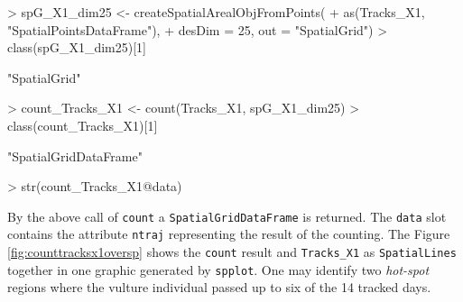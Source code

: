 \documentclass[12pt, oneside, a4paper]{scrbook}
\let\code=\texttt
\begin{document}
\begin{small}
\begin{Schunk}
\begin{Sinput}
> spG_X1_dim25 <- createSpatialArealObjFromPoints(
+   as(Tracks_X1, "SpatialPointsDataFrame"), 
+   desDim = 25, out = "SpatialGrid")
> class(spG_X1_dim25)[1]
\end{Sinput}
\begin{Soutput}
[1] "SpatialGrid"
\end{Soutput}
\begin{Sinput}
> count_Tracks_X1 <- count(Tracks_X1, spG_X1_dim25)
> class(count_Tracks_X1)[1]
\end{Sinput}
\begin{Soutput}
[1] "SpatialGridDataFrame"
\end{Soutput}
\begin{Sinput}
> str(count_Tracks_X1@data)
\end{Sinput}
\end{Schunk}
\end{small}

\par\medskip

By the above call of \code{count} a \code{SpatialGridDataFrame} is returned. The \code{data} slot contains the attribute \code{ntraj} representing the result of the counting. The Figure \ref{fig:counttracksx1oversp} shows the \code{count} result and \code{Tracks\_X1} as \code{SpatialLines} together in one graphic generated by \code{spplot}. One may identify two \textit{hot-spot} regions where the vulture individual passed up to six of the 14 tracked days.

\par\medskip
\end{document}
